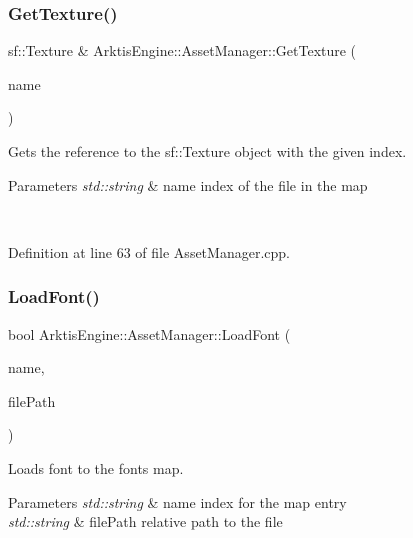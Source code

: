 \subsubsection{\texorpdfstring{GetTexture()}{GetTexture()}}
{\footnotesize\ttfamily sf\+::\+Texture \& Arktis\+Engine\+::\+Asset\+Manager\+::\+Get\+Texture (\begin{DoxyParamCaption}\item[{std\+::string}]{name }\end{DoxyParamCaption})}



Gets the reference to the sf\+::\+Texture object with the given index. 


\begin{DoxyParams}{Parameters}
{\em std\+::string} & name index of the file in the map \begin{DoxyVerb}\end{DoxyVerb}
 \\
\hline
\end{DoxyParams}


Definition at line 63 of file Asset\+Manager.\+cpp.


\begin{DoxyCode}{0}

\end{DoxyCode}
\mbox{\label{class_arktis_engine_1_1_asset_manager_a691afa1a5564f646dfb249008640cb26}} 
\subsubsection{\texorpdfstring{LoadFont()}{LoadFont()}}
{\footnotesize\ttfamily bool Arktis\+Engine\+::\+Asset\+Manager\+::\+Load\+Font (\begin{DoxyParamCaption}\item[{std\+::string}]{name,  }\item[{std\+::string}]{file\+Path }\end{DoxyParamCaption})}



Loads font to the fonts map. 


\begin{DoxyParams}{Parameters}
{\em std\+::string} & name index for the map entry\\
\hline
{\em std\+::string} & file\+Path relative path to the file \begin{DoxyVerb}\end{DoxyVerb}
 \\
\hline
\end{DoxyParams}


